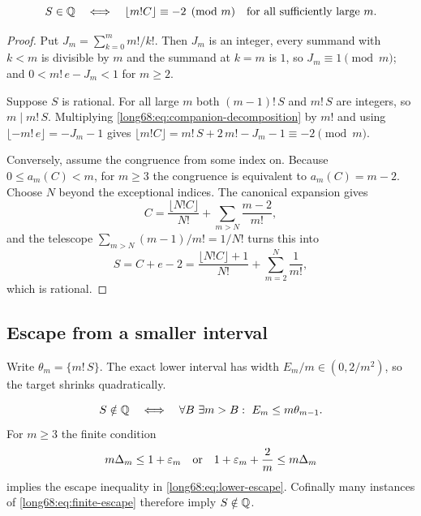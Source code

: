 \documentclass[11pt]{article}
\newcommand{\Ser}{S}
\begin{document}
\label{long68:res:lead-companion-orbit}
\begin{proposition}\label{long68:res:companion-orbit}
\[
 \Ser\in\Q
 \quad\Longleftrightarrow\quad
 \lfloor m!C\rfloor\equiv-2\pmod m
 \quad\hbox{for all sufficiently large }m.
\]
\end{proposition}

\begin{proof}
Put $J_m=\sum_{k=0}^{m}m!/k!$.  Then $J_m$ is an integer, every summand with
$k<m$ is divisible by $m$ and the summand at $k=m$ is $1$, so
$J_m\equiv1\pmod m$; and $0<m!\,e-J_m<1$ for $m\ge2$.

Suppose $\Ser$ is rational.  For all large $m$ both $(m-1)!\,\Ser$ and
$m!\,\Ser$ are integers, so $m\mid m!\,\Ser$.  Multiplying
\eqref{long68:eq:companion-decomposition} by $m!$ and using
$\lfloor -m!\,e\rfloor=-J_m-1$ gives
$\lfloor m!C\rfloor=m!\,\Ser+2\,m!-J_m-1\equiv-2\pmod m$.

Conversely, assume the congruence from some index on.  Because
$0\le a_m(C)<m$, for $m\ge3$ the congruence is equivalent to $a_m(C)=m-2$.
Choose $N$ beyond the exceptional indices.  The canonical expansion gives
\[
 C=\frac{\lfloor N!C\rfloor}{N!}+\sum_{m>N}\frac{m-2}{m!},
\]
and the telescope $\sum_{m>N}(m-1)/m!=1/N!$ turns this into
\[
 \Ser=C+e-2
 =\frac{\lfloor N!C\rfloor+1}{N!}+\sum_{m=2}^{N}\frac1{m!},
\]
which is rational.
\end{proof}

\subsection{Escape from a smaller interval}

Write $\theta_m=\{m!\,\Ser\}$.  The exact lower interval has width
$E_m/m\in(0,2/m^2)$, so the target shrinks quadratically.

\begin{proposition}\label{long68:res:lower-escape}
\begin{equation}\label{long68:eq:lower-escape}
 \Ser\notin\Q
 \quad\Longleftrightarrow\quad
 \forall B\ \exists m>B:\ E_m\le m\theta_{m-1}.
\end{equation}
For $m\ge3$ the finite condition
\begin{equation}\label{long68:eq:finite-escape}
 m\Delta_m\le1+\varepsilon_m
 \quad\hbox{or}\quad
 1+\varepsilon_m+\frac2m\le m\Delta_m
\end{equation}
implies the escape inequality in \eqref{long68:eq:lower-escape}.  Cofinally many
instances of \eqref{long68:eq:finite-escape} therefore imply $\Ser\notin\Q$.
\end{proposition}
\end{document}
